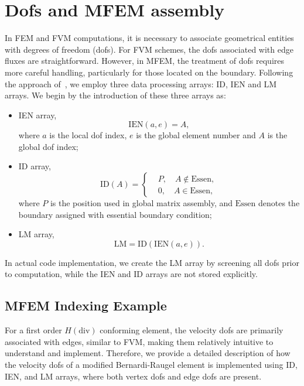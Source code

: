 \section{Dofs and MFEM assembly}
In FEM and FVM computations, it is necessary to associate geometrical entities with
degrees of freedom (dofs). For FVM schemes, the dofs associated with
edge fluxes are straightforward. However, in MFEM, the treatment of dofs requires
more careful handling, particularly for those located on the boundary. 
Following the approach of~\cite{FEMHughes}, we employ three data processing arrays: ID, IEN and LM
arrays.
We begin by the introduction of these three arrays as:
\begin{itemize}
		  \item IEN array,
					 \begin{equation}
								\text{IEN}(a,e) = A,
					 \end{equation}
					 where $a$ is the local dof index, $e$ is the global element
					 number and $A$ is the global dof index;
		  \item ID array,
					 \begin{equation}
								\text{ID}(A) = \left \{ 
								\begin{aligned}
										  &P, \quad A \not\in \text{Essen}, \\
										  &0, \quad A \in \text{Essen},
								\end{aligned}
								\right.
					 \end{equation}
					 where $P$ is the position used in global matrix assembly, 
					 and $\text{Essen}$ denotes the boundary assigned with 
					 essential boundary condition;
		  \item LM array,
					 \begin{equation}
								\text{LM} = \text{ID}(\text{IEN}(a,e)).
					 \end{equation}
\end{itemize}
In actual code implementation, we create the LM array by screening all dofs prior 
to computation, while the IEN and ID arrays are not stored explicitly.

\subsection{MFEM Indexing Example}
For a first order $H(\text{div})$ conforming element, the velocity dofs are primarily associated with edges, 
similar to
FVM, making them relatively intuitive to understand and implement. 
Therefore, we provide a detailed
description of how the velocity dofs of a modified Bernardi-Raugel element is implemented using
ID, IEN, and LM arrays, where both vertex dofs and edge dofs are present. 

